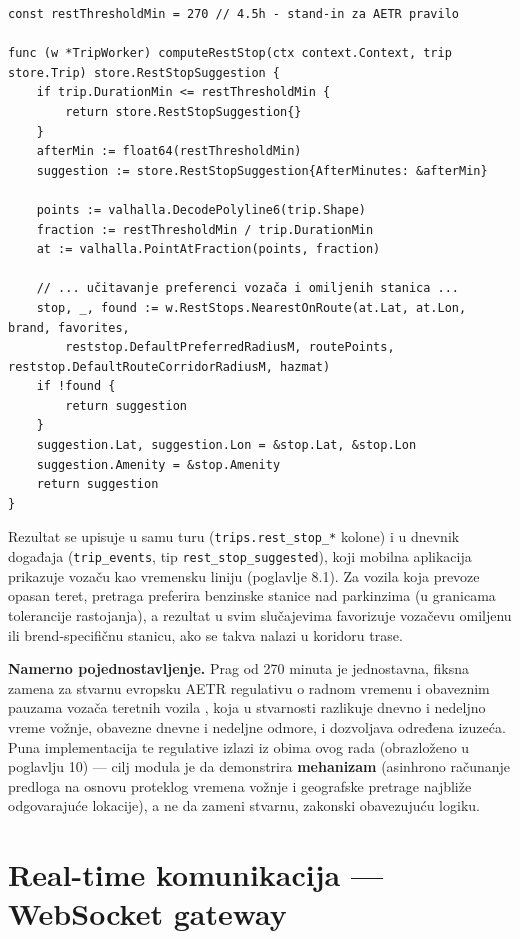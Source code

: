 \begin{lstlisting}[caption={[Proračun predloga pauze u \texttt{TripWorker}]Proračun predloga pauze u \texttt{TripWorker} (\texttt{backend/internal/worker/trip\_worker.go})}]
const restThresholdMin = 270 // 4.5h - stand-in za AETR pravilo

func (w *TripWorker) computeRestStop(ctx context.Context, trip store.Trip) store.RestStopSuggestion {
	if trip.DurationMin <= restThresholdMin {
		return store.RestStopSuggestion{}
	}
	afterMin := float64(restThresholdMin)
	suggestion := store.RestStopSuggestion{AfterMinutes: &afterMin}

	points := valhalla.DecodePolyline6(trip.Shape)
	fraction := restThresholdMin / trip.DurationMin
	at := valhalla.PointAtFraction(points, fraction)

	// ... učitavanje preferenci vozača i omiljenih stanica ...
	stop, _, found := w.RestStops.NearestOnRoute(at.Lat, at.Lon, brand, favorites,
		reststop.DefaultPreferredRadiusM, routePoints, reststop.DefaultRouteCorridorRadiusM, hazmat)
	if !found {
		return suggestion
	}
	suggestion.Lat, suggestion.Lon = &stop.Lat, &stop.Lon
	suggestion.Amenity = &stop.Amenity
	return suggestion
}
\end{lstlisting}

Rezultat se upisuje u samu turu (\texttt{trips.rest\_stop\_*} kolone) i u dnevnik događaja (\texttt{trip\_events}, tip \texttt{rest\_stop\_suggested}), koji mobilna aplikacija prikazuje vozaču kao vremensku liniju (poglavlje 8.1). Za vozila koja prevoze opasan teret, pretraga preferira benzinske stanice nad parkinzima (u granicama tolerancije rastojanja), a rezultat u svim slučajevima favorizuje vozačevu omiljenu ili brend-specifičnu stanicu, ako se takva nalazi u koridoru trase.

\textbf{Namerno pojednostavljenje.} Prag od 270 minuta je jednostavna, fiksna zamena za stvarnu evropsku AETR regulativu o radnom vremenu i obaveznim pauzama vozača teretnih vozila \cite{aetr}, koja u stvarnosti razlikuje dnevno i nedeljno vreme vožnje, obavezne dnevne i nedeljne odmore, i dozvoljava određena izuzeća. Puna implementacija te regulative izlazi iz obima ovog rada (obrazloženo u poglavlju 10) — cilj modula je da demonstrira \textbf{mehanizam} (asinhrono računanje predloga na osnovu proteklog vremena vožnje i geografske pretrage najbliže odgovarajuće lokacije), a ne da zameni stvarnu, zakonski obavezujuću logiku.

\section{Real-time komunikacija — WebSocket gateway}

